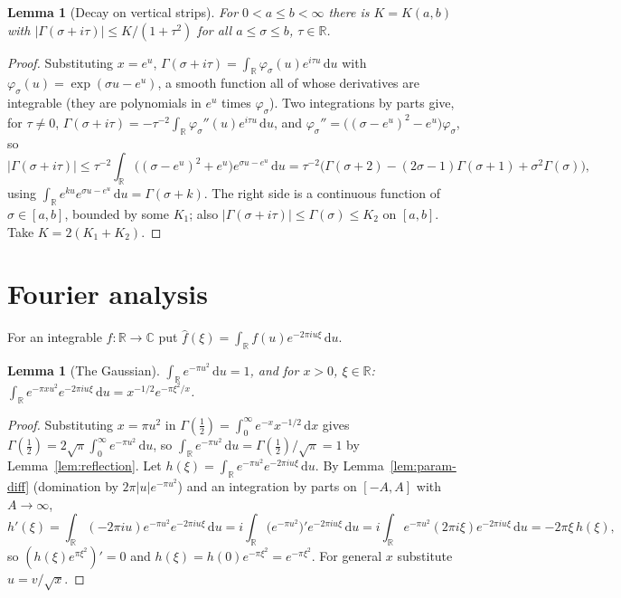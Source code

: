 \documentclass[11pt]{article}
\newtheorem{lemma}[theorem]{Lemma}
\theoremstyle{definition}
\newcommand{\C}{\mathbb{C}}
\newcommand{\R}{\mathbb{R}}
\newcommand{\dd}{\,\mathrm{d}}
\begin{document}
\begin{lemma}[Decay on vertical strips]\label{lem:gamma-decay}
For $0<a\le b<\infty$ there is $K=K(a,b)$ with $|\Gamma(\sigma+i\tau)|\le K/(1+\tau^{2})$ for all $a\le\sigma\le b$, $\tau\in\R$.
\end{lemma}
\begin{proof}
Substituting $x=e^{u}$, $\Gamma(\sigma+i\tau)=\int_\R\varphi_\sigma(u)e^{i\tau u}\dd u$ with $\varphi_\sigma(u)=\exp(\sigma u-e^{u})$, a smooth function all of whose derivatives are integrable (they are polynomials in $e^{u}$ times $\varphi_\sigma$).
Two integrations by parts give, for $\tau\neq0$, $\Gamma(\sigma+i\tau)=-\tau^{-2}\int_\R\varphi_\sigma''(u)e^{i\tau u}\dd u$, and
$\varphi_\sigma''=\bigl((\sigma-e^{u})^{2}-e^{u}\bigr)\varphi_\sigma$, so
\[
|\Gamma(\sigma+i\tau)|\le\tau^{-2}\int_\R\bigl((\sigma-e^{u})^{2}+e^{u}\bigr)e^{\sigma u-e^{u}}\dd u
=\tau^{-2}\bigl(\Gamma(\sigma+2)-(2\sigma-1)\Gamma(\sigma+1)+\sigma^{2}\Gamma(\sigma)\bigr),
\]
using $\int_\R e^{ku}e^{\sigma u-e^{u}}\dd u=\Gamma(\sigma+k)$.
The right side is a continuous function of $\sigma\in[a,b]$, bounded by some $K_1$; also $|\Gamma(\sigma+i\tau)|\le\Gamma(\sigma)\le K_2$ on $[a,b]$.
Take $K=2(K_1+K_2)$.
\end{proof}

\section{Fourier analysis}\label{sec:fourier}

For an integrable $f:\R\to\C$ put $\widehat f(\xi)=\int_\R f(u)e^{-2\pi iu\xi}\dd u$.

\begin{lemma}[The Gaussian]\label{lem:gauss}
$\int_\R e^{-\pi u^{2}}\dd u=1$, and for $x>0$, $\xi\in\R$:
$\displaystyle\int_\R e^{-\pi xu^{2}}e^{-2\pi iu\xi}\dd u=x^{-1/2}e^{-\pi\xi^{2}/x}$.
\end{lemma}
\begin{proof}
Substituting $x=\pi u^{2}$ in $\Gamma(\tfrac12)=\int_0^\infty e^{-x}x^{-1/2}\dd x$ gives
$\Gamma(\tfrac12)=2\sqrt\pi\int_0^\infty e^{-\pi u^{2}}\dd u$, so
$\int_\R e^{-\pi u^{2}}\dd u=\Gamma(\tfrac12)/\sqrt\pi=1$ by Lemma~\ref{lem:reflection}.
Let $h(\xi)=\int_\R e^{-\pi u^{2}}e^{-2\pi iu\xi}\dd u$. By Lemma~\ref{lem:param-diff} (domination by $2\pi|u|e^{-\pi u^{2}}$) and an integration by parts on $[-A,A]$ with $A\to\infty$,
\[
h'(\xi)=\int_\R(-2\pi iu)e^{-\pi u^{2}}e^{-2\pi iu\xi}\dd u
=i\int_\R\bigl(e^{-\pi u^{2}}\bigr)'e^{-2\pi iu\xi}\dd u
=i\int_\R e^{-\pi u^{2}}(2\pi i\xi)e^{-2\pi iu\xi}\dd u
=-2\pi\xi\,h(\xi),
\]
so $(h(\xi)e^{\pi\xi^{2}})'=0$ and $h(\xi)=h(0)e^{-\pi\xi^{2}}=e^{-\pi\xi^{2}}$.
For general $x$ substitute $u=v/\sqrt x$.
\end{proof}
\end{document}
